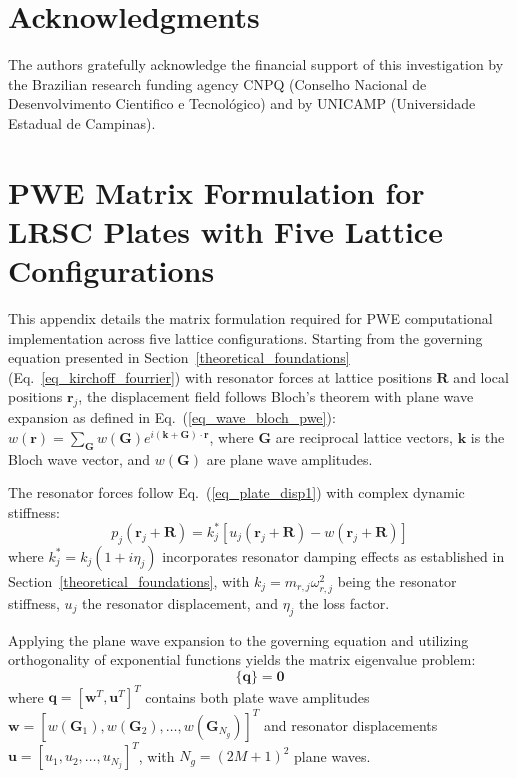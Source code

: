 \documentclass[review,numbers,sort&compress]{elsarticle}
\begin{document}
\newpage
\section*{Acknowledgments}
The authors gratefully acknowledge the financial support of this investigation by the Brazilian research funding agency CNPQ (Conselho Nacional de Desenvolvimento Cientifico e Tecnológico) and by UNICAMP (Universidade Estadual de Campinas).

\newpage
\appendix
\section{PWE Matrix Formulation for LRSC Plates with Five Lattice Configurations}\label{AppenA_supplement_results1}

This appendix details the matrix formulation required for PWE computational implementation across five lattice configurations. Starting from the governing equation presented in Section~\ref{theoretical_foundations} (Eq.~\ref{eq_kirchoff_fourrier}) with resonator forces at lattice positions $\mathbf{R}$ and local positions $\mathbf{r}_j$, the displacement field follows Bloch's theorem with plane wave expansion as defined in Eq.~(\ref{eq_wave_bloch_pwe}): $w(\mathbf{r}) = \sum_{\mathbf{G}} w(\mathbf{G}) e^{i(\mathbf{k}+\mathbf{G}) \cdot \mathbf{r}}$, where $\mathbf{G}$ are reciprocal lattice vectors, $\mathbf{k}$ is the Bloch wave vector, and $w(\mathbf{G})$ are plane wave amplitudes.

The resonator forces follow Eq.~(\ref{eq_plate_disp1}) with complex dynamic stiffness:
\begin{equation}
p_j(\mathbf{r}_j + \mathbf{R}) = k_j^*[u_j(\mathbf{r}_j + \mathbf{R}) - w(\mathbf{r}_j + \mathbf{R})]
\label{eq:resonator_force_app}
\end{equation}
where $k_j^* = k_j(1 + i\eta_j)$ incorporates resonator damping effects as established in Section~\ref{theoretical_foundations}, with $k_j = m_{r,j}\omega_{r,j}^2$ being the resonator stiffness, $u_j$ the resonator displacement, and $\eta_j$ the loss factor.

Applying the plane wave expansion to the governing equation and utilizing orthogonality of exponential functions yields the matrix eigenvalue problem:
\begin{equation}
[\mathbf{K}-\omega^{2}\mathbf{M}]\bigl\{ \mathbf{q} \bigr\} = \mathbf{0}
\label{eq:pwe_eigenvalue_app}
\end{equation}
where $\mathbf{q} = [\mathbf{w}^T, \mathbf{u}^T]^T$ contains both plate wave amplitudes $\mathbf{w} = [w(\mathbf{G}_1), w(\mathbf{G}_2), \ldots, w(\mathbf{G}_{N_g})]^T$ and resonator displacements $\mathbf{u} = [u_1, u_2, \ldots, u_{N_j}]^T$, with $N_g = (2M+1)^2$ plane waves.
\end{document}
